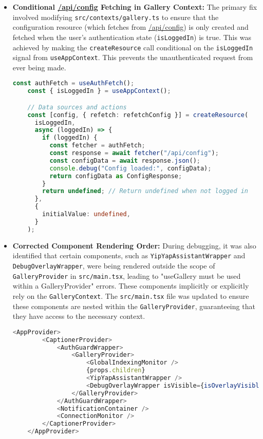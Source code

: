 \documentclass{article}
\begin{document}
\begin{itemize}
    \item \textbf{Conditional \url{/api/config} Fetching in Gallery Context:}
    The primary fix involved modifying \texttt{src/contexts/gallery.ts} to ensure that the configuration resource (which fetches from \url{/api/config}) is only created and fetched when the user's authentication state (\texttt{isLoggedIn}) is true. This was achieved by making the \texttt{createResource} call conditional on the \texttt{isLoggedIn} signal from \texttt{useAppContext}. This prevents the unauthenticated request from ever being made.

    \begin{lstlisting}[language=TypeScript, caption=Conditional Config Resource Creation in \texttt{src/contexts/gallery.ts}]
    const authFetch = useAuthFetch();
    const { isLoggedIn } = useAppContext();

    // Data sources and actions
    const [config, { refetch: refetchConfig }] = createResource(
      isLoggedIn,
      async (loggedIn) => {
        if (loggedIn) {
          const fetcher = authFetch;
          const response = await fetcher("/api/config");
          const configData = await response.json();
          console.debug("Config loaded:", configData);
          return configData as ConfigResponse;
        }
        return undefined; // Return undefined when not logged in
      },
      {
        initialValue: undefined,
      }
    );
    \end{lstlisting}

    \item \textbf{Corrected Component Rendering Order:}
    During debugging, it was also identified that certain components, such as \texttt{YipYapAssistantWrapper} and \texttt{DebugOverlayWrapper}, were being rendered outside the scope of \texttt{GalleryProvider} in \texttt{src/main.tsx}, leading to "useGallery must be used within a GalleryProvider" errors. These components implicitly or explicitly rely on the \texttt{GalleryContext}. The \texttt{src/main.tsx} file was updated to ensure these components are nested within the \texttt{GalleryProvider}, guaranteeing that they have access to the necessary context.

    \begin{lstlisting}[language=TypeScript, caption=Updated Component Hierarchy in \texttt{src/main.tsx}]
    <AppProvider>
        <CaptionerProvider>
            <AuthGuardWrapper>
                <GalleryProvider>
                    <GlobalIndexingMonitor />
                    {props.children}
                    <YipYapAssistantWrapper />
                    <DebugOverlayWrapper isVisible={isOverlayVisible()} />
                </GalleryProvider>
            </AuthGuardWrapper>
            <NotificationContainer />
            <ConnectionMonitor />
        </CaptionerProvider>
    </AppProvider>
    \end{lstlisting}
\end{itemize}
\end{document}
